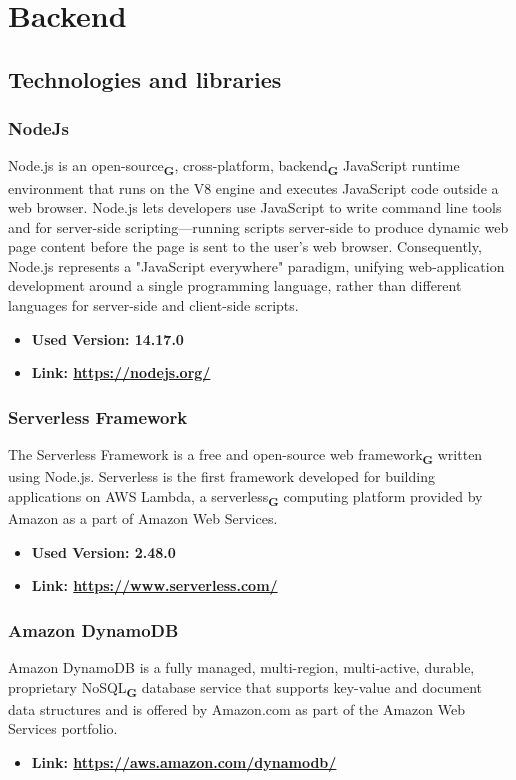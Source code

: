 \section{Backend}
\subsection{Technologies and libraries}
\subsubsection{NodeJs}
Node.js is an open-source\textsubscript{\textbf{G}}, cross-platform, backend\textsubscript{\textbf{G}} JavaScript runtime environment that runs on the
V8 engine and executes JavaScript code outside a web browser. Node.js lets developers use JavaScript
to write command line tools and for server-side scripting—running scripts server-side to produce
dynamic web page content before the page is sent to the user’s web browser. Consequently, Node.js
represents a "JavaScript everywhere" paradigm, unifying web-application development around a single
programming language, rather than different languages for server-side and client-side scripts.
\begin{itemize}
    \item \textbf{Used Version: 14.17.0}
    \item \textbf{Link: \url{https://nodejs.org/}}
\end{itemize}
\subsubsection{Serverless Framework}
The Serverless Framework is a free and open-source web framework\textsubscript{\textbf{G}} written using Node.js. Serverless is the first
framework developed for building applications on AWS Lambda, a serverless\textsubscript{\textbf{G}} computing platform provided
by Amazon as a part of Amazon Web Services.
\begin{itemize}
    \item \textbf{Used Version: 2.48.0}
    \item \textbf{Link: \url{https://www.serverless.com/}}
\end{itemize}
\subsubsection{Amazon DynamoDB}
Amazon DynamoDB is a fully managed, multi-region, multi-active, durable, proprietary NoSQL\textsubscript{\textbf{G}} database service that supports key-value
and document data structures and is offered by Amazon.com as part of the Amazon Web Services
portfolio.
\begin{itemize}
    \item \textbf{Link: \url{https://aws.amazon.com/dynamodb/}}
\end{itemize}

